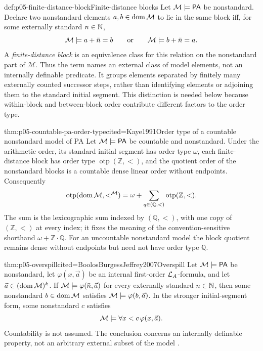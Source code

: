 \begin{hbdefinition}{def:p05-finite-distance-block}{Finite-distance blocks}
Let \(\mathcal M\models\mathsf{PA}\) be nonstandard.  Declare two nonstandard
elements \(a,b\in\operatorname{dom}\mathcal M\) to lie in the same block iff, for some
externally standard \(n\in\mathbb{N}\),
\[
  \mathcal M\models a+\bar n=b
  \qquad\text{or}\qquad
  \mathcal M\models b+\bar n=a.
\]
A \emph{finite-distance block} is an equivalence class for this relation on
the nonstandard part of \(\mathcal M\).  Thus the term names an
external class of model elements, not an internally definable predicate.
It groups elements separated by finitely many externally counted successor
steps, rather than identifying elements or adjoining them to the standard
initial segment.  This distinction is needed below because within-block and
between-block order contribute different factors to the order type.
\end{hbdefinition}

\begin{hbtheorem}{thm:p05-countable-pa-order-type}{cited=Kaye1991}{Order type of a countable nonstandard model of PA}
Let \(\mathcal M\models\mathsf{PA}\) be countable and nonstandard.  Under the
arithmetic order, its standard initial segment has order type \(\omega\),
each finite-distance block has order type
\(\operatorname{otp}(\mathbb Z,<)\), and the quotient order of the nonstandard
blocks is a countable dense linear order without endpoints.  Consequently
\[
  \operatorname{otp}(\operatorname{dom}\mathcal M,<^{\mathcal M})
  =\omega+\sum_{q\in(\mathbb Q,<)}\operatorname{otp}(\mathbb Z,<).
\]
The sum is the lexicographic sum indexed by \((\mathbb Q,<)\), with one copy of
\((\mathbb Z,<)\) at every index; it fixes the meaning of the
convention-sensitive shorthand \(\omega+\mathbb Z\cdot\mathbb Q\).  For an
uncountable nonstandard model the
block quotient remains dense without endpoints but need not have order
type \(\mathbb Q\).
\end{hbtheorem}

\begin{hbtheorem}{thm:p05-overspill}{cited=BoolosBurgessJeffrey2007}{Overspill}
Let \(\mathcal M\models\mathsf{PA}\) be nonstandard, let
\(\varphi(x,\vec a)\) be an internal first-order \(\mathcal{L}_A\)-formula,
and let \(\vec a\in(\operatorname{dom}\mathcal M)^k\).  If
\(\mathcal M\models\varphi(\bar n,\vec a)\) for every externally
standard \(n\in\mathbb{N}\), then some nonstandard \(b\in\operatorname{dom}\mathcal M\)
satisfies \(\mathcal M\models\varphi(b,\vec a)\).  In the stronger
initial-segment form, some nonstandard \(c\) satisfies
\[
  \mathcal M\models\forall x<c\,\varphi(x,\vec a).
\]
Countability is not assumed.  The conclusion concerns an internally
definable property, not an arbitrary external subset of the model
\cite{Kaye1991}.
\end{hbtheorem}

